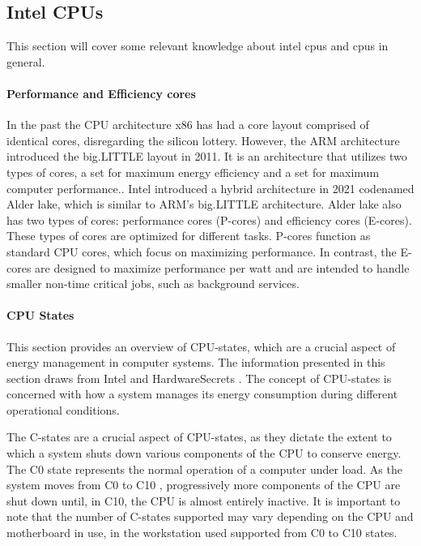 \subsection{Intel CPUs}
This section will cover some relevant knowledge about intel cpus and cpus in general.

\paragraph{Performance and Efficiency cores}
In the past the CPU architecture x86 has had a core layout comprised of identical cores, disregarding the silicon lottery. However, the ARM architecture introduced the big.LITTLE layout in 2011\cite{ARM2011origin}. It is an architecture that utilizes two types of cores, a set for maximum energy efficiency and a set for maximum computer performance.\cite{ARMWhatIsIt}. Intel introduced a hybrid architecture in 2021\cite{Intel2021Alder} codenamed Alder lake, which is similar to ARM's big.LITTLE architecture. Alder lake also has two types of cores: performance cores (P-cores) and efficiency cores (E-cores). These types of cores are optimized for different tasks. P-cores function as standard CPU cores, which focus on maximizing performance. In contrast, the E-cores are designed to maximize performance per watt and are intended to handle smaller non-time critical jobs, such as background services\cite{rotem2022intel}.

\paragraph{CPU States}\label{subsec:cpustates}

This section provides an overview of CPU-states, which are a crucial aspect of energy management in computer systems. The information presented in this section draws  from Intel \cite{CIntel} and  HardwareSecrets \cite{CHard}. The concept of CPU-states is concerned with how a system manages its energy consumption during different operational conditions.

The C-states are a crucial aspect of CPU-states, as they dictate the extent to which a system shuts down various components of the CPU to conserve energy. The C0 state represents the normal operation of a computer under load. As the system moves from C0 to C10 \cite{biksbois}, progressively more components of the CPU are shut down until, in C10, the CPU is almost entirely inactive. It is important to note that the number of C-states supported may vary depending on the CPU and motherboard in use, in \cite{biksbois} the workstation used supported from C0 to C10 states.

